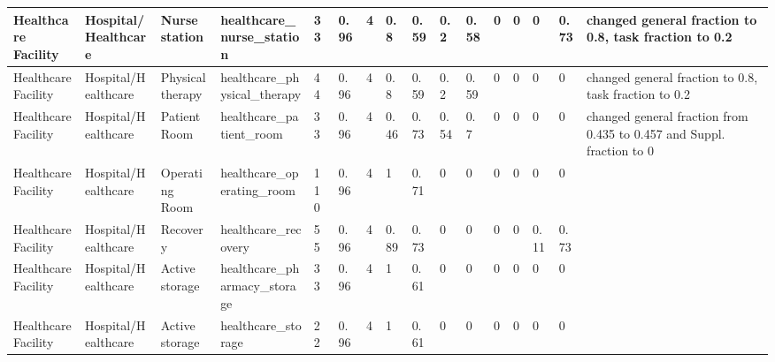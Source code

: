 \begin{center}
\begin{landscape}
\begin{longtable}{|p{0.75in}|p{0.75in}|p{0.75in}|p{0.75in}|p{0.3in}|p{0.3in}|p{0.3in}|p{0.3in}|p{0.3in}|p{0.3in}|p{0.3in}|p{0.3in}|p{0.3in}|p{0.3in}|p{0.3in}|p{0.6in}|}
      Healthcare Facility                     & Hospital/Healthcare         & Nurse station                                   & healthcare\_nurse\_station                                      & 33   & 0.96 & 4  & 0.8    & 0.59  & 0.2   & 0.58  & 0    & 0    & 0    & 0.73 & changed general fraction to 0.8, task fraction to 0.2                                 \\ \hline
      Healthcare Facility                     & Hospital/Healthcare         & Physical therapy                                & healthcare\_physical\_therapy                                   & 44   & 0.96 & 4  & 0.8    & 0.59  & 0.2   & 0.59  & 0    & 0    & 0    & 0    & changed general fraction to 0.8, task fraction to 0.2                                 \\ \hline
      Healthcare Facility                     & Hospital/Healthcare         & Patient Room                                    & healthcare\_patient\_room                                       & 33   & 0.96 & 4  & 0.46   & 0.73  & 0.54  & 0.7   & 0    & 0    & 0    & 0    & changed general fraction from 0.435 to 0.457 and Suppl. fraction to 0           \\ \hline
      Healthcare Facility                     & Hospital/Healthcare         & Operating Room                                  & healthcare\_operating\_room                                     & 110  & 0.96 & 4  & 1      & 0.71  & 0     & 0     & 0    & 0    & 0    & 0    &                                                                                       \\ \hline
      Healthcare Facility                     & Hospital/Healthcare         & Recovery                                        & healthcare\_recovery                                            & 55   & 0.96 & 4  & 0.89   & 0.73  & 0     & 0     & 0    & 0    & 0.11 & 0.73 &                                                                                       \\ \hline
      Healthcare Facility                     & Hospital/Healthcare         & Active storage                                  & healthcare\_pharmacy\_storage                                   & 33   & 0.96 & 4  & 1      & 0.61  & 0     & 0     & 0    & 0    & 0    & 0    &                                                                                       \\ \hline
      Healthcare Facility                     & Hospital/Healthcare         & Active storage                                  & healthcare\_storage                                             & 22   & 0.96 & 4  & 1      & 0.61  & 0     & 0     & 0    & 0    & 0    & 0    &                                                                                       \\ \hline

\end{longtable}
\end{landscape}
\end{center}
